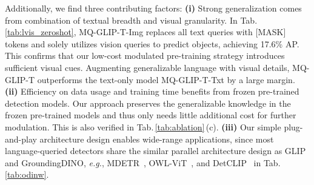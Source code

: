 Additionally, we ﬁnd three contributing factors: 
\textbf{(i)} Strong generalization comes from combination of textual breadth and visual granularity.
In Tab.\,\ref{tab:lvis_zeroshot}, MQ-GLIP-T-Img replaces all text queries with [MASK] tokens and solely utilizes vision queries to predict objects, achieving 17.6\% AP. This confirms that our low-cost modulated pre-training strategy introduces sufficient visual cues.
Augmenting generalizable language with visual details, MQ-GLIP-T outperforms the text-only model MQ-GLIP-T-Txt by a large margin.
\textbf{(ii)} Efficiency on data usage and training time benefits from frozen pre-trained detection models. Our approach preserves the generalizable knowledge in the frozen pre-trained models and thus only needs little additional cost for further modulation. This is also verified in Tab.\,\ref{tab:ablation}\,(c).
\textbf{(iii)} Our simple plug-and-play architecture design enables wide-range applications, since most language-queried detectors share the similar parallel architecture design as GLIP and GroundingDINO, \emph{e.g.}, MDETR~\cite{mdetr}, OWL-ViT~\cite{owl-vit}, and DetCLIP~\cite{yao2023detclipv2} in Tab.\,\ref{tab:odinw}. 







